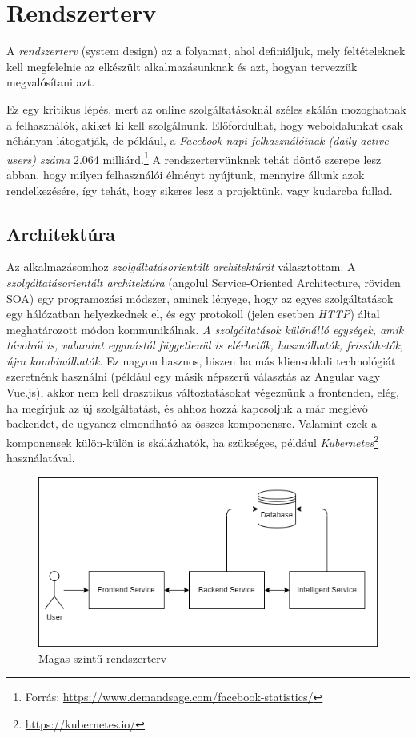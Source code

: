 \documentclass[
]{thesis-ekf}
\theoremstyle{definition}
\theoremstyle{remark}
\begin{document}
\section{Rendszerterv}
A \emph{rendszerterv} (system design) az a folyamat, ahol definiáljuk, mely feltételeknek kell megfelelnie az elkészült alkalmazásunknak és azt, hogyan tervezzük megvalósítani azt.\cite{wiki-system-design, the-complete-guide-to-system-design-in-2024}

Ez egy kritikus lépés, mert az online szolgáltatásoknál széles skálán mozoghatnak a felhasználók, akiket ki kell szolgálnunk. Előfordulhat, hogy weboldalunkat csak néhányan látogatják, de például, a \emph{Facebook napi felhasználóinak (daily active users) száma} 2.064 milliárd.\footnote{Forrás: \url{https://www.demandsage.com/facebook-statistics/}} A rendszertervünknek tehát döntő szerepe lesz abban, hogy milyen felhasználói élményt nyújtunk, mennyire állunk azok rendelkezésére, így tehát, hogy sikeres lesz a projektünk, vagy kudarcba fullad.

\subsection{Architektúra}
\label{subsec-architektura}
Az alkalmazásomhoz \emph{szolgáltatásorientált architektúrát} választottam. A \emph{szolgáltatásorientált architektúra} (angolul Service-Oriented Architecture, röviden SOA) egy programozási módszer, aminek lényege, hogy az egyes szolgáltatások egy hálózatban helyezkednek el, és egy protokoll (jelen esetben \emph{HTTP}) által meghatározott módon kommunikálnak. \emph{A szolgáltatások különálló egységek, amik távolról is, valamint egymástól függetlenül is elérhetők, használhatók, frissíthetők, újra kombinálhatók.}\cite{wiki-szolgaltatasorientalt-architektura} Ez nagyon hasznos, hiszen ha más kliensoldali technológiát szeretnénk használni (például egy másik népszerű választás az Angular vagy Vue.js), akkor nem kell drasztikus változtatásokat végeznünk a frontenden, elég, ha megírjuk az új szolgáltatást, és ahhoz hozzá kapcsoljuk a már meglévő backendet, de ugyanez elmondható az összes komponensre. Valamint ezek a komponensek külön-külön is skálázhatók, ha szükséges, például \emph{Kubernetes}\footnote{\url{https://kubernetes.io/}} használatával.

\begin{figure}[H]
	\centering
	\includegraphics[width=14cm]{images/high-level-system-design.png}
	\caption[Magas szintű rendszerterv]{Magas szintű rendszerterv}
	\label{fig-rendszerterv}
\end{figure}
\end{document}
